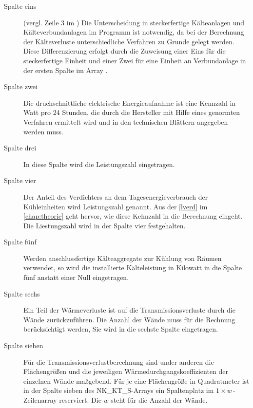 \begin{description}

	\item [{Spalte eins}] (vergl. Zeile 3 im ) Die Unterscheidung in steckerfertige
	Kälteanlagen und Kälteverbundanlagen im Programm ist notwendig, da bei
	der Berechnung der Kälteverluste unterschiedliche Verfahren zu Grunde
	gelegt werden. Diese Differenzierung erfolgt durch die Zuweisung einer
	Eins für die steckerfertige Einheit und einer Zwei für eine Einheit an
	Verbundanlage in der ersten Spalte im Array .

	\item [{Spalte zwei}] Die druchschnittliche elektrische Energieaufnahme
	ist eine Kennzahl in Watt pro 24 Stunden, die durch die Hersteller mit
	Hilfe eines genormten Verfahren ermittelt wird und in den technischen
	Blättern angegeben werden muss.

	\item [{Spalte drei}] In diese Spalte wird die Leistungszahl
	eingetragen.

	\item [{Spalte vier}] Der Anteil des Verdichters an dem
	Tagesenergieverbrauch der Kühleinheiten wird Leistungszahl genannt. Aus
	der \cref{lverd} im \cref{chap:theorie} geht hervor, wie diese Kehnzahl
	in die Berechnung eingeht. Die Liestungszahl wird in der Spalte vier
	festgehalten.

	\item [{Spalte fünf}] Werden anschlussfertige Kälteaggregate zur Kühlung
	von Räumen verwendet, so wird die installierte Kälteleistung in Kilowatt
	in die Spalte fünf anstatt einer Null eingetragen.

	\item [{Spalte sechs}] Ein Teil der Wärmeverluste ist auf die
	Transmissionsverluste durch die Wände zurückzuführen.  Die Anzahl der
	Wände muss für die Rechnung berücksichtigt werden, Sie wird in die
	sechste Spalte eingetragen.
	
	\item [{Spalte sieben}] Für die Transmissionsverlustberechnung sind
	under anderen die Flächengrößen und die jeweiligen
	Wärmedurchgangskoeffizienten der einzelnen Wände
	maßgebend. Für je
	eine Flächengröße in Quadratmeter ist in der Spalte sieben des
	NK\_KT\_S-Arrays ein Spaltenplatz im $1\times w\,$-Zeilenarray
	reserviert. Die $w$ steht für die Anzahl der Wände.


\end{description}
